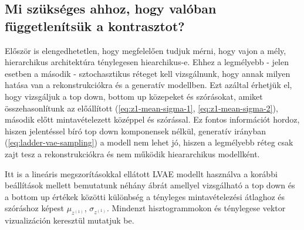 \documentclass[12pt, english]{article}
\begin{document}
\newpage

\subsection{Mi szükséges ahhoz, hogy valóban függetlenítsük a kontrasztot?}

\vspace{5mm}

\par Először is elengedhetetlen, hogy megfelelően tudjuk mérni, hogy vajon a mély, hierarchikus architektúra ténylegesen hiearchikus-e. Ehhez a legmélyebb - jelen esetben a második - sztochasztikus réteget kell vizsgálnunk, hogy annak milyen hatása van a rekonstrukciókra és a generatív modellben. Ezt azáltal érhetjük el, hogy vizsgáljuk a top down, bottom up közepeket és szórásokat, amiket összehasonlítunk az előállított (\ref{eq:z1-mean-sigma-1}, \ref{eq:z1-mean-sigma-2}),  második előtt mintavételezett középpel és szórással. Ez fontos információt hordoz, hiszen jelentéssel bíró top down komponensek nélkül, generatív irányban (\ref{eq:ladder-vae-sampling}) a modell nem lehet jó, hiszen a legmélyebb réteg csak zajt tesz a rekonstrukciókra és nem működik hieararchikus modellként.

\vspace{4mm}

\par Itt is a lineáris megszorításokkal ellátott LVAE modellt használva a korábbi beállítások mellett bemutatunk néhány ábrát amellyel vizsgálható a top down és a bottom up értékek közötti különbség a tényleges mintavételezési átlaghoz és szóráshoz képest $\mu_{z^{(1)}}$, $\sigma_{z^{(1)}}$. Mindenzt hisztogrammokon és ténylegese vektor vizualizáción keresztül mutatjuk be.

\vspace{4mm}
\end{document}
